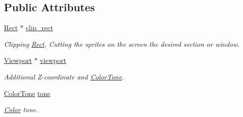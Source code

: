 \subsection*{Public Attributes}
\begin{DoxyCompactItemize}
\item 
\hypertarget{class_f2_c_1_1_plane_aa7db34e6fb3376737a7fad29b6204953}{
\hyperlink{class_f2_c_1_1_rect}{Rect} $\ast$ \hyperlink{class_f2_c_1_1_plane_aa7db34e6fb3376737a7fad29b6204953}{clip\_\-rect}}
\label{class_f2_c_1_1_plane_aa7db34e6fb3376737a7fad29b6204953}

\begin{DoxyCompactList}\small\item\em Clipping \hyperlink{class_f2_c_1_1_rect}{Rect}, Cutting the sprites on the screen the desired section or window. \item\end{DoxyCompactList}\item 
\hypertarget{class_f2_c_1_1_plane_a755aaa0644174adc1574d04a1378c22f}{
\hyperlink{class_f2_c_1_1_viewport}{Viewport} $\ast$ \hyperlink{class_f2_c_1_1_plane_a755aaa0644174adc1574d04a1378c22f}{viewport}}
\label{class_f2_c_1_1_plane_a755aaa0644174adc1574d04a1378c22f}

\begin{DoxyCompactList}\small\item\em Additional Z-\/coordinate and \hyperlink{class_f2_c_1_1_color_tone}{ColorTone}. \item\end{DoxyCompactList}\item 
\hypertarget{class_f2_c_1_1_plane_a77b2e8f8a0d3364d3328b553608d63e7}{
\hyperlink{class_f2_c_1_1_color_tone}{ColorTone} \hyperlink{class_f2_c_1_1_plane_a77b2e8f8a0d3364d3328b553608d63e7}{tone}}
\label{class_f2_c_1_1_plane_a77b2e8f8a0d3364d3328b553608d63e7}

\begin{DoxyCompactList}\small\item\em \hyperlink{class_f2_c_1_1_color}{Color} tone. \item\end{DoxyCompactList}\end{DoxyCompactItemize}
